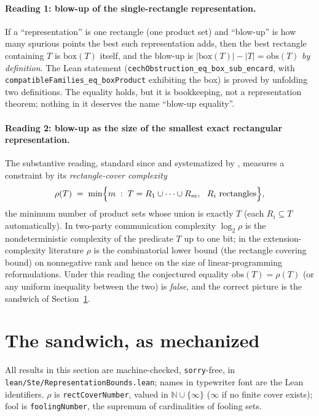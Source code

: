 \documentclass[11pt]{article}
\newcommand{\ste}[1]{\texttt{#1}}
\begin{document}
\paragraph{Reading 1: blow-up of the single-rectangle representation.}
If a ``representation'' is one rectangle (one product set) and
``blow-up'' is how many spurious points the best such representation
adds, then the best rectangle containing $T$ is $\mathrm{box}(T)$
itself, and the blow-up is $|\mathrm{box}(T)|-|T| = \mathrm{obs}(T)$
\emph{by definition}. The Lean statement
(\ste{cechObstruction\_eq\_box\_sub\_encard}, with
\ste{compatibleFamilies\_eq\_boxProduct} exhibiting the box) is proved
by unfolding two definitions. The equality holds, but it is
bookkeeping, not a representation theorem; nothing in it deserves the
name ``blow-up equality''.

\paragraph{Reading 2: blow-up as the size of the smallest exact
rectangular representation.}
The substantive reading, standard since \citet{aho1983notions} and
systematized by \citet{kushilevitz1997communication}, measures a
constraint by its \emph{rectangle-cover complexity}
\[
\rho(T)\;=\;\min\Bigl\{m \;:\; T=R_1\cup\dots\cup R_m,\ \ R_i
\text{ rectangles}\Bigr\},
\]
the minimum number of product sets whose union is exactly $T$ (each
$R_i\subseteq T$ automatically). In two-party communication complexity
$\log_2\rho$ is the nondeterministic complexity of the predicate $T$ up
to one bit; in the extension-complexity literature
\citep{yannakakis1991expressing,fiorini2015exponential} $\rho$ is the
combinatorial lower bound (the rectangle covering bound) on
nonnegative rank and hence on the size of linear-programming
reformulations. Under this reading the conjectured equality
$\mathrm{obs}(T)=\rho(T)$ (or any uniform inequality between the two)
is \emph{false}, and the correct picture is the sandwich of
Section~\ref{sec:sandwich}.

\section{The sandwich, as mechanized}\label{sec:sandwich}

All results in this section are machine-checked, \ste{sorry}-free, in
\ste{lean/Ste/RepresentationBounds.lean}; names in typewriter font are
the Lean identifiers. $\rho$ is \ste{rectCoverNumber}, valued in
$\mathbb{N}\cup\{\infty\}$ ($\infty$ if no finite cover exists);
$\mathrm{fool}$ is \ste{foolingNumber}, the supremum of cardinalities
of fooling sets.
\end{document}
